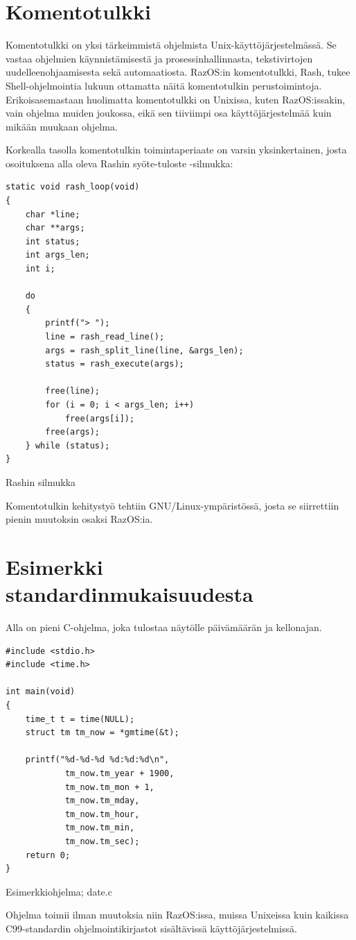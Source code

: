 \section{Komentotulkki}

Komentotulkki on yksi tärkeimmistä ohjelmista Unix-käyttöjärjestelmässä. Se vastaa ohjelmien käynnistämisestä ja prosessinhallinnasta, tekstivirtojen uudelleenohjaamisesta sekä automaatiosta. RazOS:in komentotulkki, Rash, tukee Shell-ohjelmointia lukuun ottamatta näitä komentotulkin perustoimintoja. Erikoisasemastaan huolimatta komentotulkki on Unixissa, kuten RazOS:issakin, vain ohjelma muiden joukossa, eikä sen tiiviimpi osa käyttöjärjestelmää kuin mikään muukaan ohjelma.

\par

Korkealla tasolla komentotulkin toimintaperiaate on varsin yksinkertainen, josta osoituksena alla oleva Rashin syöte-tuloste -silmukka:

\begin{listing}[H]
\begin{verbatim}
static void rash_loop(void)
{
    char *line;
    char **args;
    int status;
    int args_len;
    int i;

    do
    {
        printf("> ");
        line = rash_read_line();
        args = rash_split_line(line, &args_len);
        status = rash_execute(args);

        free(line);
        for (i = 0; i < args_len; i++)
            free(args[i]);
        free(args);
    } while (status);
}
\end{verbatim}
\caption{Rashin silmukka}
\label{lst:rash_loop}
\end{listing}

Komentotulkin kehitystyö tehtiin GNU/Linux-ympäristössä, josta se siirrettiin pienin muutoksin osaksi RazOS:ia.

\section{Esimerkki standardinmukaisuudesta}

Alla on pieni C-ohjelma, joka tulostaa näytölle päivämäärän ja kellonajan.

\begin{listing}[H]
\begin{verbatim}
#include <stdio.h>
#include <time.h>

int main(void)
{
	time_t t = time(NULL);
	struct tm tm_now = *gmtime(&t);

	printf("%d-%d-%d %d:%d:%d\n",
			tm_now.tm_year + 1900,
			tm_now.tm_mon + 1,
			tm_now.tm_mday,
			tm_now.tm_hour,
			tm_now.tm_min,
			tm_now.tm_sec);
	return 0;
}
\end{verbatim}
\caption{Esimerkkiohjelma; date.c}
\label{lst:datec}
\end{listing}

Ohjelma toimii ilman muutoksia niin RazOS:issa, muissa Unixeissa kuin kaikissa C99-standardin ohjelmointikirjastot sisältävissä käyttöjärjestelmissä.
